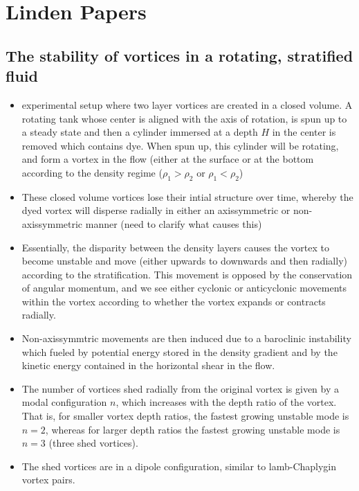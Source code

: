 \documentclass{article}
\begin{document}
\section{Linden Papers}
    \subsection{The stability of vortices in a rotating, stratified fluid}
        \begin{itemize}
            \item experimental setup where two layer vortices are created in a
            closed volume. A rotating tank whose center is aligned with the
            axis of rotation, is spun up to a steady state and then a cylinder
            immersed at a depth $H$ in the center is removed which contains dye.
            When spun up, this 
            cylinder will be rotating, and form a vortex in the flow (either at
            the surface or at the bottom according to the density regime
            ($\rho_1 > \rho_2$ or $\rho_1 < \rho_2$)
            \item These closed volume vortices lose their intial structure over
            time, whereby the dyed vortex will disperse radially in either an
            axissymmetric or non-axissymmetric manner (need to clarify what
            causes this)
            \item Essentially, the disparity between the density layers causes
            the vortex to become unstable and move (either upwards to downwards
            and then radially)
            according to the stratification. This movement is opposed by the
            conservation of angular momentum, and we see either cyclonic or
            anticyclonic movements within the vortex according to whether the
            vortex expands or contracts radially. 
            \item Non-axissymmtric movements are then induced due to a
            baroclinic instability which fueled by potential energy stored
            in the density gradient and by the kinetic energy contained in
            the horizontal shear in the flow. 
            \item The number of vortices shed radially from the original vortex
            is given by a modal configuration $n$, which increases with the
            depth ratio of the vortex. That is, for smaller vortex depth ratios,
            the fastest growing unstable mode is $n=2$, whereas for larger depth
            ratios the fastest growing unstable mode is $n=3$ (three
            shed vortices). 
            \item The shed vortices are in a dipole configuration, similar to
            lamb-Chaplygin vortex pairs.
        \end{itemize}
\end{document}
